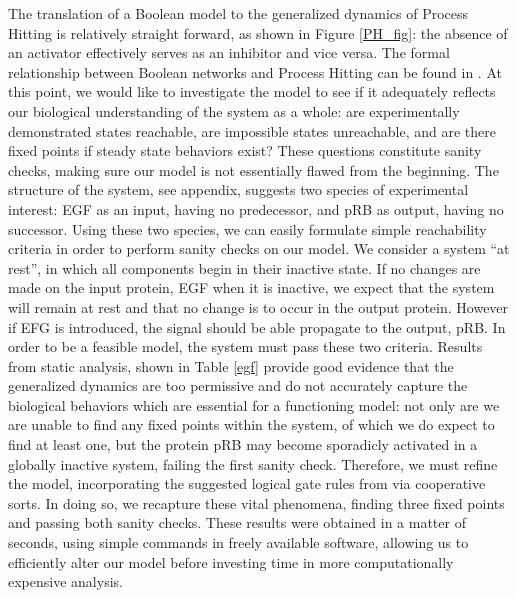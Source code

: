 \documentclass{article}
\begin{document}
The translation of a Boolean model to the generalized dynamics of Process Hitting is relatively straight forward, as shown in Figure \ref{PH_fig}: the absence of an activator effectively serves as an inhibitor and vice versa. The formal relationship between Boolean networks and Process Hitting can be found in \cite{FPIMR12-CMSB}. At this point, we would like to investigate the model to see if it adequately reflects our biological understanding of the system as a whole: are experimentally demonstrated states reachable, are impossible states unreachable, and are there fixed points if steady state behaviors exist? These questions constitute sanity checks, making sure our model is not essentially flawed from the beginning. The structure of the system, see appendix, suggests two species of experimental interest: EGF as an input, having no predecessor, and pRB as output, having no successor. Using these two species, we can easily formulate simple reachability criteria in order to perform sanity checks on our model. We consider a system ``at rest'', in which all components begin in their inactive state. If no changes are made on the input protein, EGF when it is inactive, we expect that the system will remain at rest and that no change is to occur in the output protein. However if EFG is introduced, the signal should be able propagate to the output, pRB. In order to be a feasible model, the system must pass these two criteria. Results from static analysis, shown in Table \ref{egf} provide good evidence that the generalized dynamics are too permissive and do not accurately capture the biological behaviors which are essential for a functioning model: not only are we are unable to find any fixed points within the system, of which we do expect to find at least one, but the protein pRB may become sporadicly activated in a globally inactive system, failing the first sanity check. Therefore, we must refine the model, incorporating the suggested logical gate rules from \cite{Sahin09} via cooperative sorts. In doing so, we recapture these vital phenomena, finding three fixed points and passing both sanity checks. These results were obtained in a matter of seconds, using simple commands in freely available software, allowing us to efficiently alter our model before investing time in more computationally expensive analysis.
\end{document}
